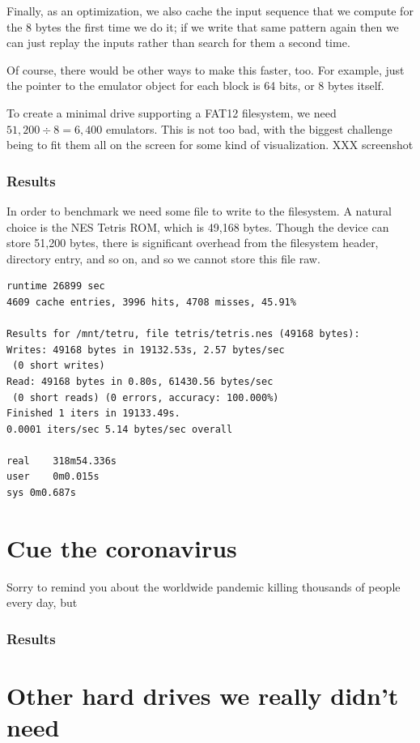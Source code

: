 \documentclass[twocolumn]{article}
\begin{document}
Finally, as an optimization, we also cache the input sequence that we
compute for the 8 bytes the first time we do it; if we write that same
pattern again then we can just replay the inputs rather than search
for them a second time.

Of course, there would be other ways to make this faster, too. For
example, just the pointer to the emulator object for each block is 64
bits, or 8 bytes itself.

To create a minimal drive supporting a FAT12 filesystem, we need
$51,200 \div 8 = 6,400$ emulators. This is not too bad, with the
biggest challenge being to fit them all on the screen for some kind of
visualization. XXX screenshot

\subsubsection{Results}

In order to benchmark we need some file to write to the filesystem. A
natural choice is the NES Tetris ROM, which is 49,168 bytes. Though the
device can store 51,200 bytes, there is significant overhead from the
filesystem header, directory entry, and so on, and so we cannot store
this file raw. 

\begin{lstlisting}
runtime 26899 sec
4609 cache entries, 3996 hits, 4708 misses, 45.91%

Results for /mnt/tetru, file tetris/tetris.nes (49168 bytes):
Writes: 49168 bytes in 19132.53s, 2.57 bytes/sec
 (0 short writes)
Read: 49168 bytes in 0.80s, 61430.56 bytes/sec
 (0 short reads) (0 errors, accuracy: 100.000%)
Finished 1 iters in 19133.49s.
0.0001 iters/sec 5.14 bytes/sec overall

real	318m54.336s
user	0m0.015s
sys	0m0.687s
\end{lstlisting}

\section{Cue the coronavirus} \label{sec:cue}

Sorry to remind you about the worldwide pandemic killing thousands of
people every day, but

\subsubsection{Results}

\section{Other hard drives we really didn't need}
\end{document}
